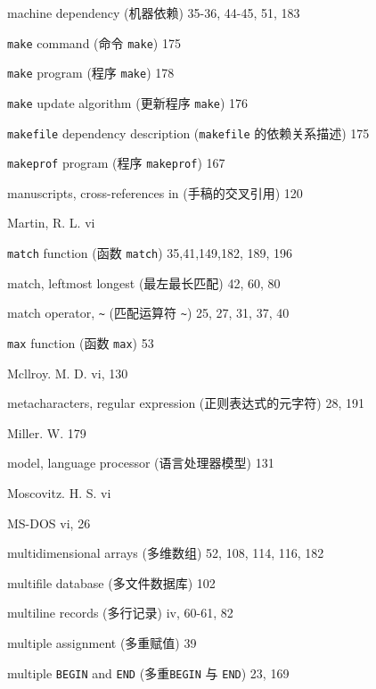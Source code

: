 \begin{multicols}{2}
\hangindent=2pc  machine dependency (机器依赖) 35-36, 44-45, 51, 183

\hangindent=2pc  \verb'make' command (命令 \verb'make') 175

\hangindent=2pc  \verb'make' program (程序 \verb'make') 178

\hangindent=2pc  \verb'make' update algorithm (更新程序
\verb'make') 176

\hangindent=2pc  \verb'makefile' dependency description
(\verb'makefile' 的依赖关系描述) 175

\hangindent=2pc  \verb'makeprof' program (程序 \verb'makeprof') 167

\hangindent=2pc  manuscripts, cross-references in
(手稿的交叉引用) 120

\hangindent=2pc  Martin, R. L. vi

\hangindent=2pc  \verb'match' function (函数 \verb'match')
35,41,149,182, 189, 196

\hangindent=2pc  match, leftmost longest (最左最长匹配) 42, 60, 80

\hangindent=2pc  match operator, \verb'~' (匹配运算符 \verb'~')
25, 27, 31, 37, 40

\hangindent=2pc  \verb'max' function (函数 \verb'max') 53

\hangindent=2pc  Mcllroy. M. D. vi, 130

\hangindent=2pc  metacharacters, regular expression
(正则表达式的元字符) 28, 191

\hangindent=2pc  Miller. W. 179

\hangindent=2pc  model, language processor (语言处理器模型) 131

\hangindent=2pc  Moscovitz. H. S. vi

\hangindent=2pc  MS-DOS vi, 26

\hangindent=2pc  multidimensional arrays (多维数组)
52, 108, 114, 116, 182

\hangindent=2pc  multifile database (多文件数据库) 102

\hangindent=2pc  multiline records (多行记录) iv, 60-61, 82

\hangindent=2pc  multiple assignment (多重赋值) 39

\hangindent=2pc  multiple \verb'BEGIN' and \verb'END' (多重\verb'BEGIN'
与 \verb'END') 23, 169


\end{multicols}
